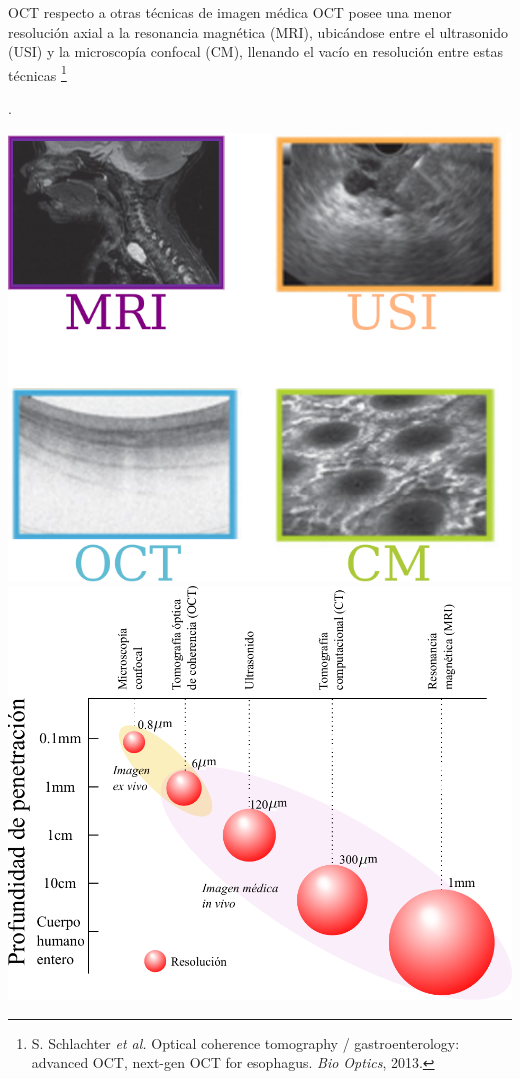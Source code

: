 \documentclass[fleqn,10pt]{beamer}
\newcommand\blfootnote[1]{%
	\begingroup
	\renewcommand\thefootnote{}\footnote{#1}%
	\addtocounter{footnote}{-1}%
	\endgroup
}
\begin{document}
\begin{frame}{OCT respecto a otras técnicas de imagen médica}
	OCT posee una menor resolución axial a la resonancia magnética (MRI), ubicándose entre el ultrasonido (USI) y la microscopía confocal (CM), llenando el vacío en resolución entre estas técnicas\blfootnote{\tiny{S. Schlachter \emph{et al.} Optical coherence tomography / gastroenterology: advanced OCT, next-gen OCT for esophagus. \emph{Bio Optics}, 2013.}}.
	
	\vfill
	\vspace*{0.5cm}
	\includegraphics[width=0.4\linewidth]{AAUgraphics/pt1/resolucion}%
	\hspace*{0.5cm}
	\includegraphics[width=0.55\linewidth]{AAUgraphics/pt1/Carlos_oct_resolucion}
\end{frame}
\end{document}
